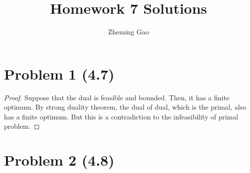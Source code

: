 \documentclass[12pt]{article}
\begin{document}
 
 
\title{Homework 7 Solutions}
\author{Zheming Gao}
\maketitle

\section*{Problem 1 (4.7)}

\begin{proof}

Suppose that the dual is feasible and bounded. Then, it has a finite optimum. By strong duality theorem, the dual of dual, which is the primal, also has a finite optimum. But this is a contradiction to the infeasibility of primal problem.

\end{proof}

\section*{Problem 2 (4.8)}
\end{document}
